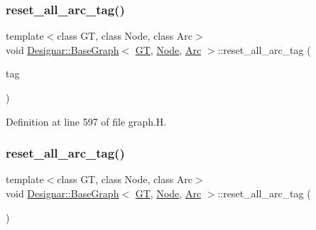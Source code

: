 \subsubsection{\texorpdfstring{reset\+\_\+all\+\_\+arc\+\_\+tag()}{reset\_all\_arc\_tag()}\hspace{0.1cm}{\footnotesize\ttfamily [1/2]}}
{\footnotesize\ttfamily template$<$class GT, class Node, class Arc$>$ \\
void \hyperlink{class_designar_1_1_base_graph}{Designar\+::\+Base\+Graph}$<$ \hyperlink{demo-buildgraph_8_c_a3001c40d2c31ca87ed96cd7d1334a55e}{GT}, \hyperlink{namespace_designar_a5af326c65aa2bd26b26c410f2030d09e}{Node}, \hyperlink{namespace_designar_a3f55fb5513d62ff47cbc8f72b8e95d6f}{Arc} $>$\+::reset\+\_\+all\+\_\+arc\+\_\+tag (\begin{DoxyParamCaption}\item[{\hyperlink{namespace_designar_ac91366256ea6ea6ac5fd483d55a7499e}{Graph\+Tag}}]{tag }\end{DoxyParamCaption})\hspace{0.3cm}{\ttfamily [inline]}}



Definition at line 597 of file graph.\+H.

\mbox{\label{class_designar_1_1_base_graph_af9ae2a4dfd676090de4b4fa04414989c}} 
\subsubsection{\texorpdfstring{reset\+\_\+all\+\_\+arc\+\_\+tag()}{reset\_all\_arc\_tag()}\hspace{0.1cm}{\footnotesize\ttfamily [2/2]}}
{\footnotesize\ttfamily template$<$class GT, class Node, class Arc$>$ \\
void \hyperlink{class_designar_1_1_base_graph}{Designar\+::\+Base\+Graph}$<$ \hyperlink{demo-buildgraph_8_c_a3001c40d2c31ca87ed96cd7d1334a55e}{GT}, \hyperlink{namespace_designar_a5af326c65aa2bd26b26c410f2030d09e}{Node}, \hyperlink{namespace_designar_a3f55fb5513d62ff47cbc8f72b8e95d6f}{Arc} $>$\+::reset\+\_\+all\+\_\+arc\+\_\+tag (\begin{DoxyParamCaption}{ }\end{DoxyParamCaption})\hspace{0.3cm}{\ttfamily [inline]}}




